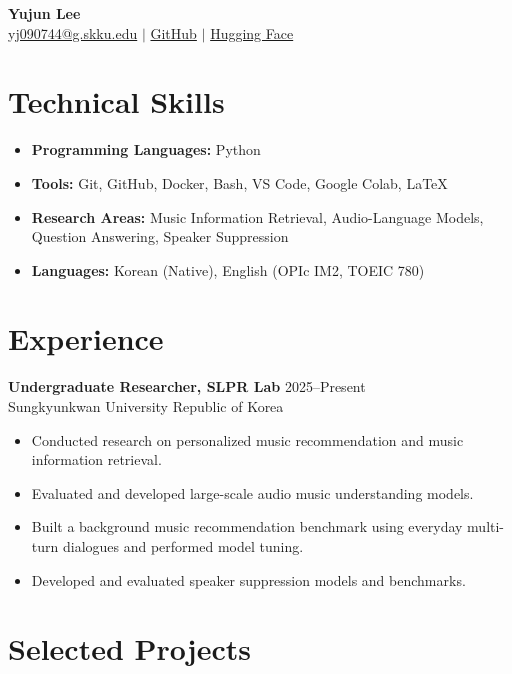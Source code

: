 \documentclass[letterpaper,10pt]{article}
\begin{document}
\begin{center}
    {\LARGE \textbf{Yujun Lee}}\\[4pt]
    \href{mailto:yj090744@g.skku.edu}{yj090744@g.skku.edu}
    \quad $|$ \quad
    \href{https://github.com/leeyujun1202}{GitHub}
    \quad $|$ \quad
    \href{https://huggingface.co/leeyujun}{Hugging Face}
\end{center}

\section*{Technical Skills}

\begin{itemize}
    \item \textbf{Programming Languages:} Python
    \item \textbf{Tools:} Git, GitHub, Docker, Bash, VS Code, Google Colab, LaTeX
    \item \textbf{Research Areas:} Music Information Retrieval, Audio-Language Models, Question Answering, Speaker Suppression
    \item \textbf{Languages:} Korean (Native), English (OPIc IM2, TOEIC 780)
\end{itemize}

\section*{Experience}

\textbf{Undergraduate Researcher, SLPR Lab} \hfill 2025--Present\\
Sungkyunkwan University \hfill Republic of Korea

\begin{itemize}
    \item Conducted research on personalized music recommendation and music information retrieval.
    \item Evaluated and developed large-scale audio music understanding models.
    \item Built a background music recommendation benchmark using everyday multi-turn dialogues and performed model tuning.
    \item Developed and evaluated speaker suppression models and benchmarks.
\end{itemize}

\section*{Selected Projects}
\end{document}
